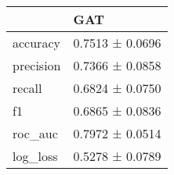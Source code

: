 \begin{tabular}{ll}
\toprule
 & GAT \\
\midrule
accuracy & 0.7513 ± 0.0696 \\
precision & 0.7366 ± 0.0858 \\
recall & 0.6824 ± 0.0750 \\
f1 & 0.6865 ± 0.0836 \\
roc_auc & 0.7972 ± 0.0514 \\
log_loss & 0.5278 ± 0.0789 \\
\bottomrule
\end{tabular}
